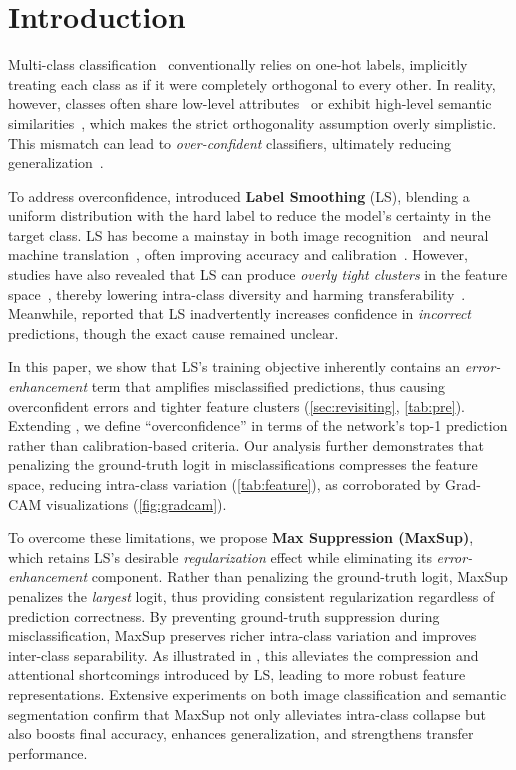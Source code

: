 \section{Introduction}
\label{sec:intro}
Multi-class classification~\citep{russakovsky2015imagenet, lecun1998mnist} conventionally relies on one-hot labels, implicitly treating each class as if it were completely orthogonal to every other. In reality, however, classes often share low-level attributes~\citep{zeiler2014visualizing, silla2011survey} or exhibit high-level semantic similarities~\citep{chen2021hsva, yi2022exploring, novack2023chils}, which makes the strict orthogonality assumption overly simplistic. This mismatch can lead to \emph{over-confident} classifiers, ultimately reducing generalization~\citep{guo2020online}.

To address overconfidence, \citet{szegedy2016rethinking} introduced \textbf{Label Smoothing} (LS), blending a uniform distribution with the hard label to reduce the model’s certainty in the target class. LS has become a mainstay in both image recognition~\citep{he2016deep, touvron2021training, liu2021swin, zhou2022sp} and neural machine translation~\citep{gao2020towards, alves2023steering}, often improving accuracy and calibration~\citep{muller2019does}. However, studies have also revealed that LS can produce \emph{overly tight clusters} in the feature space~\citep{kornblith2021better, sariyildiz2022no, xu2023quantifying}, thereby lowering intra-class diversity and harming transferability~\citep{feng2021rethinking}. Meanwhile, \citet{zhu2022rethinking} reported that LS inadvertently increases confidence in \emph{incorrect} predictions, though the exact cause remained unclear.

In this paper, we show that LS’s training objective inherently contains an \emph{error-enhancement} term that amplifies misclassified predictions, thus causing overconfident errors and tighter feature clusters (\cref{sec:revisiting}, \cref{tab:pre}). Extending \citet{zhu2022rethinking}, we define “overconfidence” in terms of the network’s top-1 prediction rather than calibration-based criteria. Our analysis further demonstrates that penalizing the ground-truth logit in misclassifications compresses the feature space, reducing intra-class variation (\cref{tab:feature}), as corroborated by Grad-CAM visualizations (\cref{fig:gradcam}).

To overcome these limitations, we propose \textbf{Max Suppression (MaxSup)}, which retains LS’s desirable \emph{regularization} effect while eliminating its \emph{error-enhancement} component. Rather than penalizing the ground-truth logit, MaxSup penalizes the \emph{largest} logit, thus providing consistent regularization regardless of prediction correctness. By preventing ground-truth suppression during misclassification, MaxSup preserves richer intra-class variation and improves inter-class separability. As illustrated in , this alleviates the compression and attentional shortcomings introduced by LS, leading to more robust feature representations. Extensive experiments on both image classification and semantic segmentation confirm that MaxSup not only alleviates intra-class collapse but also boosts final accuracy, enhances generalization, and strengthens transfer performance.

